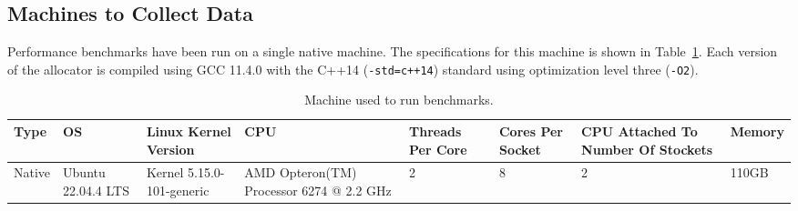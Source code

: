 




\subsection{Machines to Collect Data}

Performance benchmarks have been run on a single native machine. The specifications for this machine is shown in Table~\ref{table:machine}. Each version of the allocator is compiled using GCC 11.4.0 with the C++14 (\texttt{-std=c++14}) standard using optimization level three (\texttt{-O2}).

\begin{table}[H]
\centering
\footnotesize
\begin{tabular}{p{1cm}p{2in}p{20mm}p{1cm}p{50pt}p{2cm}p{1cm}p{1cm}p{2cm}p{15mm}}
Type   & \multicolumn{3}{p{1cm}}{OS}                 & Linux Kernel Version      & CPU                                      & Threads Per Core & Cores Per Socket & CPU Attached To Number Of Stockets & Memory \\
\hline
Native & \multicolumn{3}{p{1cm}}{Ubuntu 22.04.4 LTS} & Kernel 5.15.0-101-generic & AMD Opteron(TM) Processor 6274 @ 2.2 GHz & 2                & 8                & 2                                  & 110GB 
\end{tabular}
\caption{Machine used to run benchmarks.}
\label{table:machine}
\end{table}


